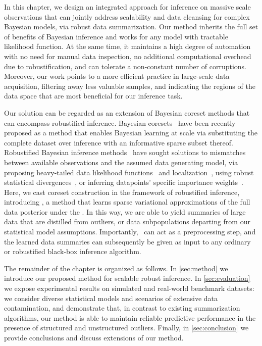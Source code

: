 In this chapter, we design an integrated approach for inference on massive scale observations that can jointly address scalability and data cleansing for complex Bayesian models, via robust data summarization. Our method inherits the full set of benefits of Bayesian inference and works for any model with tractable likelihood function. At the same time, it maintains a high degree of automation with no need for manual data inspection, no additional computational overhead due to robustification, and can tolerate a non-constant number of corruptions. Moreover, our work points to a more efficient practice in large-scale data acquisition, filtering away less valuable samples, and indicating the regions of the data space that are most beneficial for our inference task. 

Our solution can be regarded as an extension of Bayesian coreset methods that can encompass robustified inference. Bayesian coresets~\citep{huggins16, campbell19jmlr, campbell19neurips} have been recently proposed as a method that enables Bayesian learning at scale via substituting the complete dataset over inference with an informative sparse subset thereof. Robustified Bayesian inference methods~\citep{berger94} have sought solutions to mismatches between available observations and the assumed data generating model, %
via proposing heavy-tailed data likelihood functions~\citep{huber09, insua12} and localization~\citep{definetti61, wang18}, using robust statistical divergences~\citep{futami18, knoblauch18, miller19},  or inferring datapoints' specific importance weights~\citep{wang17}. Here, we cast coreset construction in the framework of robustified inference, introducing \emph{\bcores{}}, a method that learns sparse variational approximations of the full data posterior under the \bdiv{}. In this way, we are able to yield summaries of large data that are distilled from outliers, or data subpopulations departing from our statistical model assumptions. Importantly, \mbox{\bcores}~can act as a preprocessing step, and the learned data summaries can subsequently be given as input to any ordinary or robustified black-box inference algorithm.

The remainder of the chapter is organized as follows. In \cref{sec:method} we introduce our proposed method for scalable robust inference. In \cref{sec:evaluation} we expose experimental results on simulated and real-world benchmark datasets: we consider diverse statistical models and scenarios of extensive data contamination, and demonstrate that, in contrast to existing summarization algorithms, our method is able to maintain reliable predictive performance in the presence of structured and unstructured outliers. Finally, in \cref{sec:conclusion} we provide conclusions and discuss extensions of our method.





